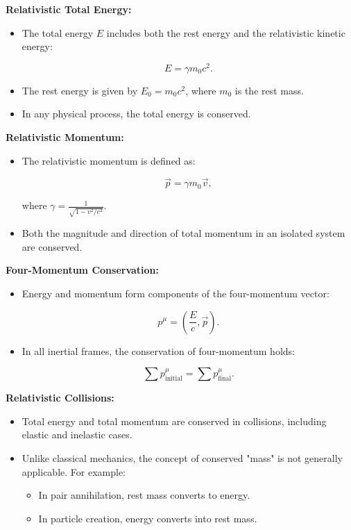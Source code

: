\documentclass{article}
\newcommand{\eqbox}[1]{\begin{tcolorbox}[colback=gray!10] #1 \end{tcolorbox}}
\newcommand{\conceptbox}[1]{\begin{tcolorbox}[colback=blue!10] #1 \end{tcolorbox}}
\begin{document}
\conceptbox{
    \textbf{Relativistic Total Energy:}
    \begin{itemize}
        \item The total energy \( E \) includes both the rest energy and the relativistic kinetic energy:
        \eqbox{
        \[
        E = \gamma m_0 c^2.
        \]
        }
        \item The rest energy is given by \( E_0 = m_0 c^2 \), where \( m_0 \) is the rest mass.
        \item In any physical process, the total energy is conserved.
    \end{itemize}
}
\conceptbox{
    \textbf{Relativistic Momentum:}
    \begin{itemize}
        \item The relativistic momentum is defined as:
        \eqbox{
        \[
        \vec{p} = \gamma m_0 \vec{v},
        \]
        }
        where \( \gamma = \frac{1}{\sqrt{1 - v^2/c^2}} \).
        \item Both the magnitude and direction of total momentum in an isolated system are conserved.
    \end{itemize}
}

\conceptbox{
    \textbf{Four-Momentum Conservation:}
    \begin{itemize}
        \item Energy and momentum form components of the four-momentum vector:
        \eqbox{
        \[
        p^\mu = \left( \frac{E}{c}, \vec{p} \right).
        \]
        }
        \item In all inertial frames, the conservation of four-momentum holds:
        \eqbox{
        \[
        \sum p^\mu_{\text{initial}} = \sum p^\mu_{\text{final}}.
        \]
    }
    \end{itemize}
}

\conceptbox{
    \textbf{Relativistic Collisions:}
    \begin{itemize}
        \item Total energy and total momentum are conserved in collisions, including elastic and inelastic cases.
        \item Unlike classical mechanics, the concept of conserved "mass" is not generally applicable. For example:
        \begin{itemize}
            \item In pair annihilation, rest mass converts to energy.
            \item In particle creation, energy converts into rest mass.
        \end{itemize}
    \end{itemize}
}
\end{document}
